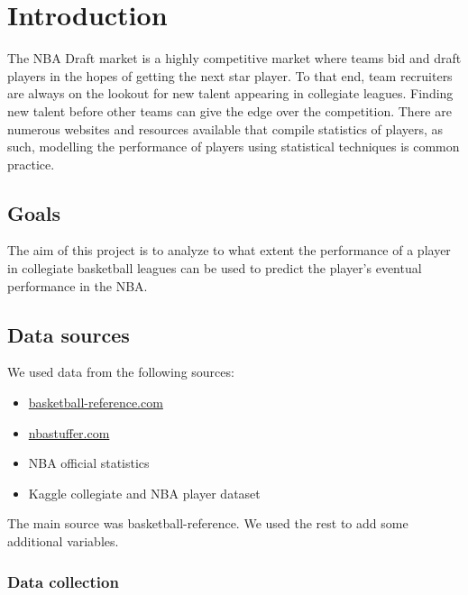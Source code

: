 
\section{Introduction}%
\label{sec:introduction}

The NBA Draft market is a highly competitive market where teams bid and draft
players in the hopes of getting the next star player. To that end, team
recruiters are always on the lookout for new talent appearing in collegiate
leagues. Finding new talent before other teams can give the edge over the
competition. There are numerous websites and resources available that compile
statistics of players, as such, modelling the performance of players using
statistical techniques is common practice.

\subsection{Goals}%
\label{sub:goals}

The aim of this project is to analyze to what extent the performance of a player
in collegiate basketball leagues can be used to predict the player's eventual
performance in the NBA.

\subsection{Data sources}%
\label{sub:data-sources}

We used data from the following sources:

\begin{itemize}
  \item \href{http://www.basketball-reference.com}{basketball-reference.com} \cite{noauthor_basketball_nodate}
  \item \href{http://www.nbastuffer.com}{nbastuffer.com} \cite{noauthor_nbastuffer_2017}
  \item NBA official statistics \cite{noauthor_draft_nodate}
  \item Kaggle collegiate and NBA player dataset \cite{noauthor_college_nodate,noauthor_t-rank_nodate}
\end{itemize}

The main source was basketball-reference. We used the rest to add some
additional variables.

\subsubsection{Data collection}%
\label{ssub:data-collection}

